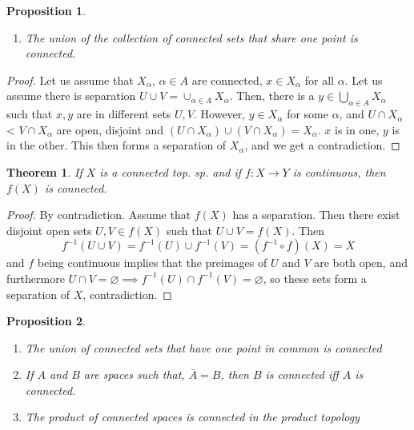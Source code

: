 \documentclass{article}
\newtheorem{theorem}{Theorem}
\newtheorem{proposition}{Proposition}
\begin{document}
 \begin{proposition}
 \begin{enumerate}[1)]
     \item The union of the collection of connected sets that share one point is connected. 
 \end{enumerate}
 \end{proposition}
 \begin{proof}
 Let us assume that $X_\alpha$, $\alpha\in A$ are connected, $x\in X_\alpha$ for all $\alpha$. Let us assume there is separation $U\cup V= \displaystyle\cup_{\alpha\in A}X_\alpha$. Then, there is a $y\in\displaystyle\bigcup_{\alpha\in A}X_\alpha$ such that $x,y$ are in different sets $U,V$. However, $y\in X_\alpha$ for some $\alpha$, and $U\cap X_\alpha$< $V\cap X_\alpha$ are open, disjoint and $(U\cap X_\alpha) \cup (V\cap X_\alpha)=X_\alpha$. $x$ is in one, $y$ is in the other. This then forms a separation of $X_\alpha$, and we get a contradiction.
 \end{proof}
\begin{theorem}
	If $X$ is a connected top. sp. and if $f:X\rightarrow{Y}$ is continuous, then $f(X)$ is connected.
	\end{theorem}
\begin{proof}
	By contradiction.  Assume that $f(X)$ has a separation.  Then there exist disjoint open sets $U,V\in f(X)$ such that $U\cup V=f(X)$.  Then
	\begin{equation*}
	f^{-1}(U\cup V) = f^{-1}(U)\cup{}f^{-1}(V) = (f^{-1}\circ{f})(X) = X
	\end{equation*}
	and $f$ being continuous implies that the preimages of $U$ and $V$ are both open, and furthermore $U\cap{V}=\varnothing\implies{}f^{-1}(U)\cap{}f^{-1}(V)=\varnothing$, so these sets form a separation of $X$, contradiction.
\end{proof}
\begin{proposition}
	\begin{enumerate}
		\item The union of connected sets that have one point in common is connected
		\item If $A$ and $B$ are spaces such that, $\bar{A}=B$, then $B$ is connected iff $A$ is connected.
		\item The product of connected spaces is connected in the product topology
	\end{enumerate}
\end{proposition}
\end{document}
